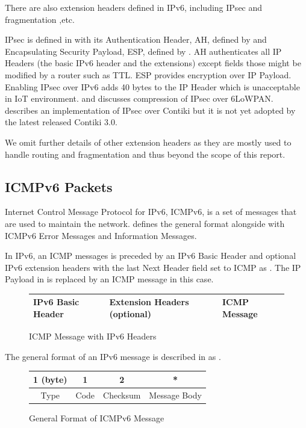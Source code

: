 There are also extension headers defined in IPv6\cite{rfc2460}, including IPsec and fragmentation ,etc.

IPsec is defined in \cite{rfc4301} with its Authentication Header, AH, defined by \cite{rfc4302} and Encapsulating Security Payload, ESP, defined by \cite{rfc4303}. AH authenticates all IP Headers (the basic IPv6 header and the extensions) except fields  those might be modified by a router such as TTL. ESP provides encryption over IP Payload. Enabling IPsec over IPv6 adds 40 bytes to the IP Header which is unacceptable in IoT environment. \cite{6LoWPANIPsec} and \cite{CompressIPsec} discusses compression of IPsec over 6LoWPAN. \cite{ContikiIPsec} describes an implementation of IPsec over Contiki but it is not yet adopted by the latest released Contiki 3.0.

We omit further details of other extension headers as they are mostly used to handle routing and fragmentation and thus beyond the scope of this report.

\subsection{ICMPv6 Packets} \label{Subsec: ICMPv6}
Internet Control Message Protocol for IPv6, ICMPv6, is a set of messages that are used to maintain the network. \cite{rfc4443} defines the general format alongside with ICMPv6 Error Messages and Information Messages. 

In IPv6, an ICMP messages is preceded by an IPv6 Basic Header and optional IPv6 extension headers with the last Next Header field set to ICMP as . The IP Payload in  is replaced by an ICMP message in this case.

\begin{figure}[h!]
	\centering
	\begin{tabular}{|l|l|l|}
		\hline
		IPv6 Basic Header & Extension Headers (optional) & ICMP Message \\ \hline
	\end{tabular}
	\caption{ICMP Message with IPv6 Headers}
	\label{Fig: ICMP with IPv6}
\end{figure}

The general format of an IPv6 message is described in \cite{rfc4443} as .
\begin{figure}[h!]
	\centering
	\begin{tabular}{|c|c|c|c|}
	\hline
	1 (byte) & 1    & 2        & *            \\ \hline
	Type     & Code & Checksum & Message Body \\ \hline
	\end{tabular}
	\caption{General Format of ICMPv6 Message}
	\label{Fig: General Format of ICMPv6 Message}
\end{figure}

